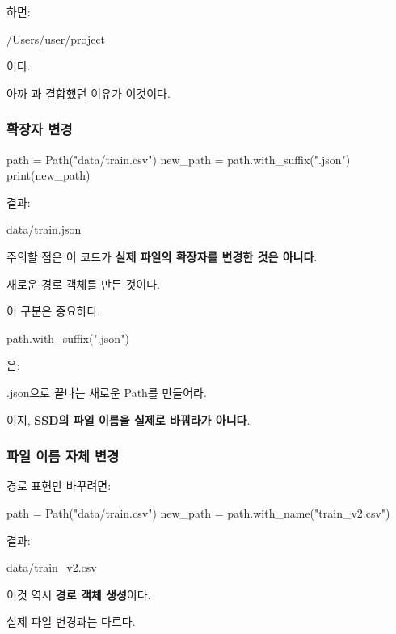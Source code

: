 하면:

\begin{dhkzsh}
/Users/user/project
\end{dhkzsh}

이다.

아까 과 결합했던 이유가 이것이다.

\subsubsection{확장자 변경}

\begin{dhkcode}
path = Path("data/train.csv")
new_path = path.with_suffix(".json")
print(new_path)
\end{dhkcode}

결과:

\begin{dhkzsh}
data/train.json
\end{dhkzsh}

주의할 점은 이 코드가 \textbf{실제 파일의 확장자를 변경한 것은 아니다}.

새로운 경로 객체를 만든 것이다.

이 구분은 중요하다.

\begin{dhkcode}
path.with_suffix(".json")
\end{dhkcode}

은:
\begin{dhksmry}[centered]
.json으로 끝나는 새로운 Path를 만들어라.
\end{dhksmry}

이지, \textbf{SSD의 파일 이름을 실제로 바꿔라가 아니다}.

\subsubsection{파일 이름 자체 변경}

경로 표현만 바꾸려면:

\begin{dhkcode}
path = Path("data/train.csv")
new_path = path.with_name("train_v2.csv")
\end{dhkcode}

결과:

\begin{dhkzsh}
data/train_v2.csv
\end{dhkzsh}

이것 역시 \textbf{경로 객체 생성}이다.

실제 파일 변경과는 다르다.

